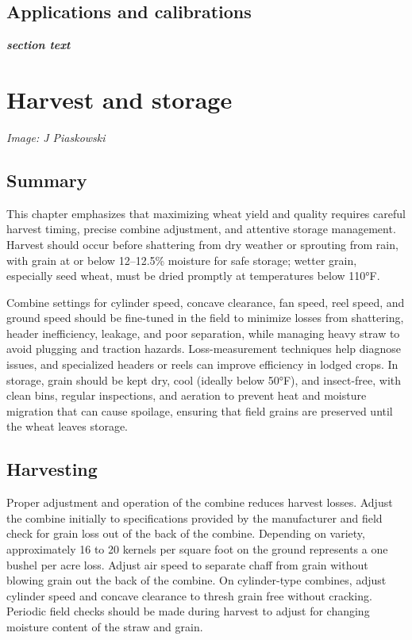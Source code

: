 \documentclass[
  letterpaper,
  DIV=11,
  numbers=noendperiod]{scrreprt}
\begin{document}
\section{Applications and
calibrations}\label{applications-and-calibrations}

\textbf{\emph{section text}}


\chapter{Harvest and storage}\label{harvest-and-storage}

\emph{Image: J Piaskowski}

\section{Summary}\label{summary}

This chapter emphasizes that maximizing wheat yield and quality requires
careful harvest timing, precise combine adjustment, and attentive
storage management. Harvest should occur before shattering from dry
weather or sprouting from rain, with grain at or below 12--12.5\%
moisture for safe storage; wetter grain, especially seed wheat, must be
dried promptly at temperatures below 110°F.

Combine settings for cylinder speed, concave clearance, fan speed, reel
speed, and ground speed should be fine-tuned in the field to minimize
losses from shattering, header inefficiency, leakage, and poor
separation, while managing heavy straw to avoid plugging and traction
hazards. Loss-measurement techniques help diagnose issues, and
specialized headers or reels can improve efficiency in lodged crops. In
storage, grain should be kept dry, cool (ideally below 50°F), and
insect-free, with clean bins, regular inspections, and aeration to
prevent heat and moisture migration that can cause spoilage, ensuring
that field grains are preserved until the wheat leaves storage.

\section{Harvesting}\label{harvesting}

Proper adjustment and operation of the combine reduces harvest losses.
Adjust the combine initially to specifications provided by the
manufacturer and field check for grain loss out of the back of the
combine. Depending on variety, approximately 16 to 20 kernels per square
foot on the ground represents a one bushel per acre loss. Adjust air
speed to separate chaff from grain without blowing grain out the back of
the combine. On cylinder-type combines, adjust cylinder speed and
concave clearance to thresh grain free without cracking. Periodic field
checks should be made during harvest to adjust for changing moisture
content of the straw and grain.
\end{document}

